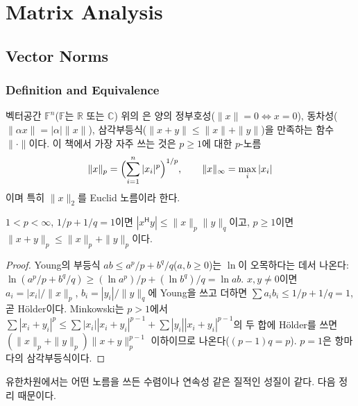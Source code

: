 \chapter{Matrix Analysis}
\label{ch:matrix-analysis}



\section{Vector Norms}
\label{sec:vector-norms}

\subsection{Definition and Equivalence}

벡터공간 $\mathbb{F}^n$($\mathbb{F}$는 $\mathbb{R}$ 또는 $\mathbb{C}$) 위의 은 양의 정부호성($\|x\|=0\iff x=0$), 동차성($\|\alpha x\|=|\alpha|\|x\|$), 삼각부등식($\|x+y\|\le\|x\|+\|y\|$)을 만족하는 함수 $\|\cdot\|$이다. 이 책에서 가장 자주 쓰는 것은 $p\ge1$에 대한 $p$-노름
\[
\|x\|_p=\Bigl(\sum_{i=1}^n|x_i|^p\Bigr)^{1/p},\qquad\|x\|_\infty=\max_i|x_i|
\]
이며 특히 $\|x\|_2$를 Euclid 노름이라 한다.

\begin{proposition}
\label{prop:holder}
$1<p<\infty$, $1/p+1/q=1$이면 $|x^{\mathsf H}y|\le\|x\|_p\|y\|_q$이고, $p\ge1$이면 $\|x+y\|_p\le\|x\|_p+\|y\|_p$이다.
\end{proposition}

\begin{proof}
Young의 부등식 $ab\le a^p/p+b^q/q$($a,b\ge0$)는 $\ln$이 오목하다는 데서 나온다: $\ln(a^p/p+b^q/q)\ge(\ln a^p)/p+(\ln b^q)/q=\ln ab$. $x,y\ne0$이면 $a_i=|x_i|/\|x\|_p$, $b_i=|y_i|/\|y\|_q$에 Young을 쓰고 더하면 $\sum a_ib_i\le1/p+1/q=1$, 곧 Hölder이다. Minkowski는 $p>1$에서 $\sum|x_i+y_i|^p\le\sum|x_i||x_i+y_i|^{p-1}+\sum|y_i||x_i+y_i|^{p-1}$의 두 합에 Hölder를 쓰면 $(\|x\|_p+\|y\|_p)\|x+y\|_p^{p-1}$ 이하이므로 나온다($(p-1)q=p$). $p=1$은 항마다의 삼각부등식이다.
\end{proof}

유한차원에서는 어떤 노름을 쓰든 수렴이나 연속성 같은 질적인 성질이 같다. 다음 정리 때문이다.

